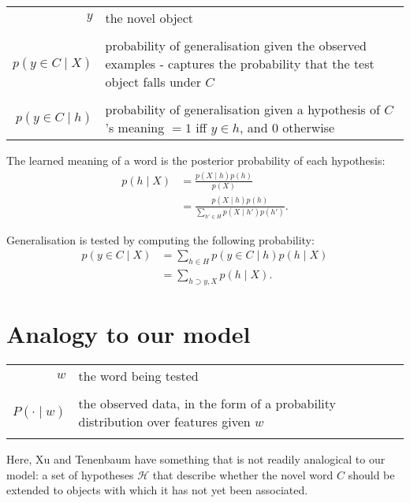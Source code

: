 \documentclass{tufte-book}
\begin{document}
\begin{tabular}{rl}
    $y$ & the novel object\\\\
    $p(y\in C \mid X)$
    &  \specialcell{probability of generalisation given the observed examples\\
                    \quad 
                    - captures the probability that the test object falls under $C$\\
                }
                \\\\
    $p(y\in C \mid h)$
    &  \specialcell{probability of generalisation given a hypothesis of $C$'s meaning\\
                    \quad 
                    $= 1$ iff $y\in h$, and $0$ otherwise
                }

\end{tabular}

\vspace{1cm}

The learned meaning of a word is the posterior probability of each hypothesis:
\begin{align*}
    p(h \mid X) 
    &= \frac{p(X\mid h)p(h)}{p(X)}\\
    &= \frac{p(X\mid h)p(h)}{\sum_{h'\in H} p(X \mid h')p(h')}.
\end{align*}

Generalisation is tested by computing the following probability:
\begin{align*}
    p(y\in C \mid X) 
    &= \sum_{h\in H} p(y\in C \mid h)p(h\mid X)\\
    &= \sum_{h\supset y, X} p(h\mid X).
\end{align*}

\section{Analogy to our model}

\begin{tabular}{rl}
    $w$
    & the word being tested
    \\\\
    $P(\cdot \mid w)$
    & \specialcell{the observed data, in the form of a \\ probability distribution over features given $w$}
    \\\\
\end{tabular}

Here, Xu and Tenenbaum have something that is not readily analogical to our model: a set of hypotheses $\mathcal{H}$ that describe whether the novel word $C$ should be extended to objects with which it has not yet been associated.
\end{document}
